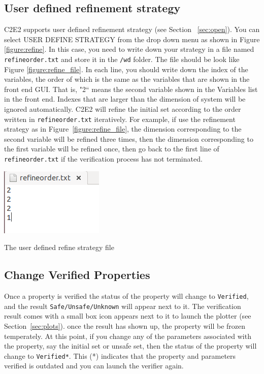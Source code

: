 \documentclass{tufte-book} %
\begin{document}
\subsection{User defined refinement strategy}\label{sec:refinement_defined}
C2E2 supports user defined refinement strategy (see Section ~\ref{sec:open}). You can select USER DEFINE STRATEGY from the drop down menu as shown in Figure \ref{figure:refine}. In this case, you need to write down your strategy in a file named \texttt{refineorder.txt} and store it in the \texttt{/wd} folder. The file should be look like Figure \ref{figure:refine_file}. In each line, you should write down the index of the variables, the order of which is the same as the variables that are shown in the front end GUI. That is, "2`` means the second variable shown in the Variables list in the front end. Indexes that are larger than the dimension of system will be ignored automatically. C2E2 will refine the initial set according to the order written in \texttt{refineorder.txt} iteratively. For example, if use the refinement strategy as in Figure~\ref{figure:refine_file}, the dimension corresponding to the second variable will be refined three times, then the dimension corresponding to the first variable will be refined once, then go back to the first line of \texttt{refineorder.txt} if the verification process has not terminated.

\begin{marginfigure}
 \centerline{\includegraphics[scale=.25,keepaspectratio=true]{Images/refine_order.png}}
 \caption{The user defined refine strategy file} 
  \label{figure:refine_file}
\end{marginfigure}


\subsection{Change Verified Properties}
Once a property is verified the status of the property will change to \texttt{Verified}, and the result \texttt{Safe/Unsafe/Unknown} will appear next to it. The verification result comes with a small box icon appears next to it to launch the plotter (see Section~\ref{sec:plots}). once the result has shown up, the property will be frozen temperately. At this point, if you change any of the parameters associated with the property, say the initial set or unsafe set, then the status of the property will change to \texttt{Verified*}. This (*) indicates that the property and parameters verified is outdated and you can launch the verifier again.
\end{document}
